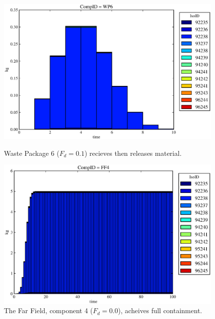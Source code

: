 \begin{frame}[ctb!]
\begin{figure}[htbp!]
\begin{minipage}[b]{0.45\linewidth}
\end{minipage}
\hspace{0.05\linewidth}
\begin{minipage}[b]{0.45\linewidth}
  \includegraphics[width=\textwidth]{./images/mcI2.eps}
  \caption[Case MCI Waste Package Contaminants.]{ 
    Waste Package 6 ($F_d = 0.1$) recieves then releases material.
    }
  \label{fig:mcIwp6}

  \includegraphics[width=\textwidth]{./images/mcI0.eps}
  \caption[Case MCI Waste Package Contaminants.]{ 
    The Far Field, component 4 ($F_d = 0.0$), acheives full containment.
    }
  \label{fig:mcIff0}


  \end{minipage}
\end{figure}
\end{frame}


